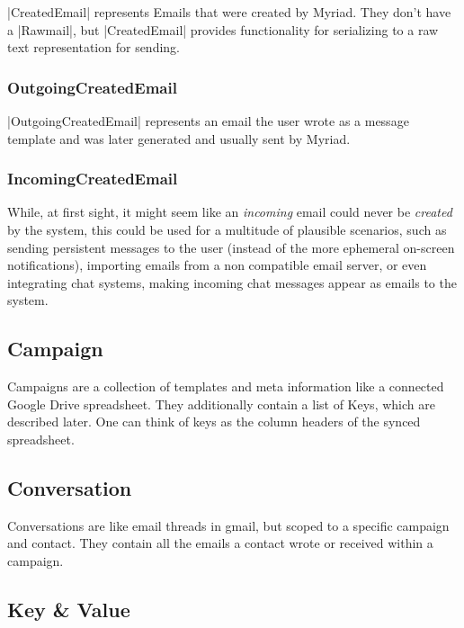 |CreatedEmail| represents Emails that were created by Myriad. They don't have a |Rawmail|, but |CreatedEmail| provides functionality for serializing to a raw text representation for sending.

\subsubsection{OutgoingCreatedEmail}

|OutgoingCreatedEmail| represents an email the user wrote as a message template and was later generated and usually sent by Myriad.

\subsubsection{IncomingCreatedEmail}

While, at first sight, it might seem like an \emph{incoming} email could never be \emph{created} by the system, this could be used for a multitude of plausible scenarios, such as sending persistent messages to the user (instead of the more ephemeral on-screen notifications), importing emails from a non  compatible email server, or even integrating chat systems, making incoming chat messages appear as emails to the system.

\subsection{Campaign}

Campaigns are a collection of templates and meta information like a connected Google Drive spreadsheet. They additionally contain a list of Keys, which are described later. One can think of keys as the column headers of the synced spreadsheet.

\subsection{Conversation}

Conversations are like email threads in gmail, but scoped to a specific campaign and contact. They contain all the emails a contact wrote or received within a campaign.

\subsection{Key \& Value}


